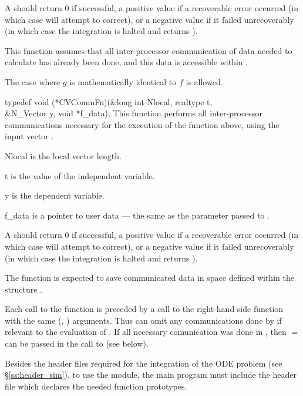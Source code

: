 {
  A  should return 0 if successful, a positive value if a recoverable
  error occurred (in which case {\cvode} will attempt to correct), or a negative 
  value if it failed unrecoverably (in which case the integration is halted and
   returns ). 
}
{
  This function assumes that all inter-processor communication of data needed to 
  calculate  has already been done, and this data is accessible within
  .

  The case where $g$ is mathematically identical to $f$ is allowed.
}
{
  typedef void (*CVCommFn)(&long int Nlocal, realtype t,  \\
                           &N\_Vector y, void *f\_data);
}
{
  This function performs all inter-processor communications necessary 
  for the execution of the  function above, using the input vector .
}
{
  \begin{args}[Nlocal]
  \item[Nlocal] 
    is the local vector length.
  \item[t]
    is the value of the independent variable.
  \item[y]
    is the dependent variable. 
  \item[f\_data]
    is a pointer to user data --- the same as the       
    parameter passed to .  
  \end{args}
}
{
  A  should return 0 if successful, a positive value if a recoverable
  error occurred (in which case {\cvode} will attempt to correct), or a negative 
  value if it failed unrecoverably (in which case the integration is halted and
   returns ). 
}
{
  The  function is expected to save communicated data in space defined
  within the structure . 

  Each call to the  function is preceded by a call to the right-hand side
  function  with the same (, ) arguments.  Thus  can omit 
  any communications done by  if relevant to the evaluation of .
  If all necessary comunication was done in , then  $=$ 
  can be passed in the call to  (see below).
}

Besides the header files required for the integration of the ODE problem
(see \S\ref{ss:header_sim}),  to use the {\cvbbdpre} module, the main program 
must include the header file  which declares the needed
function prototypes.

